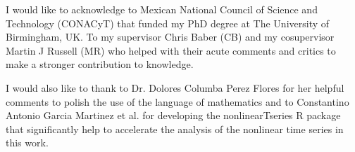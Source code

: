 
\begin{acknowledgements}      

I would like to acknowledge to Mexican National Council of Science and Technology (CONACyT)
that funded my PhD degree at The University of Birmingham, UK.
To my supervisor Chris Baber (CB) and my cosupervisor Martin J Russell (MR) 
who helped with their acute comments and critics to make a stronger contribution to 
knowledge.

I would also like to thank to Dr. Dolores Columba Perez Flores for her helpful 
comments to polish the use of the language of mathematics and to 
Constantino Antonio Garcia Martinez et al. for developing the nonlinearTseries R package 
that significantly help to accelerate the analysis of the nonlinear time series in this work.


\end{acknowledgements}
